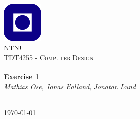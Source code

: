 \begin{titlepage}
\begin{center}
\includegraphics[width=0.15\textwidth]{img/NTNU.png}~\\[1cm]

\textsc{\LARGE NTNU}\\[1.5cm]

\textsc{\Large TDT4255 - Computer Design}\\[0.5cm]

\HRule \\[0.4cm]
{ \huge \bfseries Exercise 1}\\[0.5cm]
{\large \textit{Mathias Ose, Jonas Halland, Jonatan Lund}}\\[0.2cm]
\HRule \\[1.5cm]



\vfill

{\large \today}
\end{center}
\end{titlepage}
